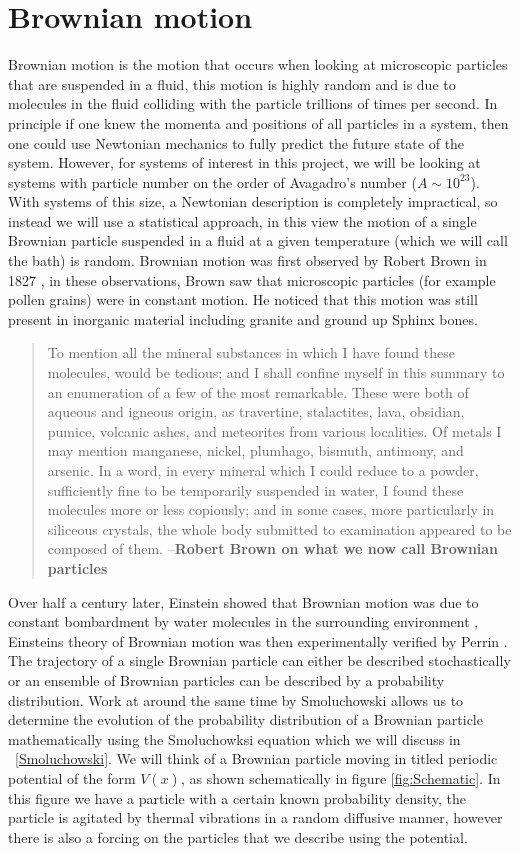\section{Brownian motion}
Brownian motion is the motion that occurs when looking at microscopic particles that are suspended in a fluid, this motion is highly random and is due to molecules in the fluid colliding with the particle trillions of times per second. In principle if one knew the momenta and positions of all particles in a system, then one could use Newtonian mechanics to fully predict the future state of the system. However, for systems of interest in this project, we will be looking at systems with particle number on the order of Avagadro's number ($A \sim 10^{23}$). With systems of this size, a Newtonian description is completely impractical, so instead we will use a statistical approach, in this view the motion of a single Brownian particle suspended in a fluid at a given temperature (which we will call the bath) is random.
Brownian motion was first observed by Robert Brown in 1827 \cite{Brown1828}, in these observations, Brown saw that microscopic particles (for example pollen grains) were in constant motion. He noticed that this motion was still present in inorganic material including granite and ground up Sphinx bones. 
\begin{quote}
To mention all the mineral substances in which I have found these molecules, would be tedious; and I shall confine myself in this summary to an enumeration of a few of the most remarkable. These were both of aqueous and igneous origin, as travertine, stalactites, lava, obsidian, pumice, volcanic ashes, and meteorites from various localities. Of metals I may mention manganese, nickel, plumhago, bismuth, antimony, and arsenic. In a word, in every mineral which I could reduce to a powder, sufficiently fine to be temporarily suspended in water, I found these molecules more or less copiously; and in some cases, more particularly in siliceous crystals, the whole body submitted to examination appeared to be composed of them. --\textbf{Robert Brown on what we now call Brownian particles}
\end{quote}
Over half a century later, Einstein showed that Brownian motion was due to constant bombardment by water molecules in the surrounding environment \cite{Einstein1905}, Einsteins theory of Brownian motion was then experimentally verified by Perrin \cite{Perrin2013}. The trajectory of a single Brownian particle can either be described stochastically or an ensemble of Brownian particles can be described by a probability distribution. Work at around the same time by Smoluchowski allows us to determine the evolution of the probability distribution of a Brownian particle mathematically using the Smoluchowksi equation which we will discuss in ~\autoref{Smoluchowski}. We will think of a Brownian particle moving in titled periodic potential of the form $V(x)$, as shown schematically in figure \ref{fig:Schematic}. In this figure we have a particle with a certain known probability density, the particle is agitated by thermal vibrations in a random diffusive manner, however there is also a forcing on the particles that we describe using the potential.

